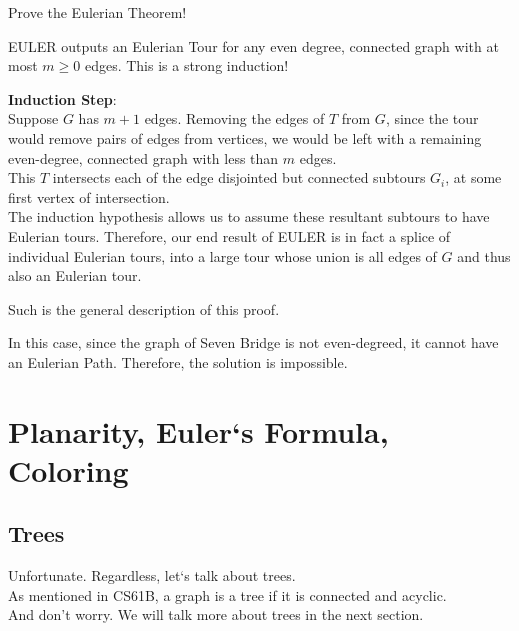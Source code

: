 \begin{ln-think}{Prove the Eulerian Theorem!}{}
\begin{bindenum}
{            EULER outputs an Eulerian Tour for any even degree, connected graph with at most $m \geq 0$ edges. This is a strong induction!
        }
        \item[] {
            \textbf{Induction Step}: \\
            Suppose $G$ has $m + 1$ edges. Removing the edges of $T$ from $G$, since the tour would remove pairs of edges from vertices, we would be left with a remaining even-degree, connected graph with less than $m$ edges. \\
            This $T$ intersects each of the edge disjointed but connected subtours $G_i$, at some first vertex of intersection. \\
            The induction hypothesis allows us to assume these resultant subtours to have Eulerian tours. Therefore, our end result of EULER is in fact a splice of individual Eulerian tours, into a large tour whose union is all edges of $G$ and thus also an Eulerian tour.
        }
    \end{bindenum}
    Such is the general description of this proof.
\end{ln-think}
In this case, since the graph of Seven Bridge is not even-degreed, it cannot have an Eulerian Path. Therefore, the solution is impossible.

\section{Planarity, Euler`s Formula, Coloring}

\subsection{Trees}
Unfortunate. Regardless, let`s talk about trees. \\
As mentioned in CS61B, a graph is a tree if it is connected and acyclic. \\
And don't worry. We will talk more about trees in the next section.

